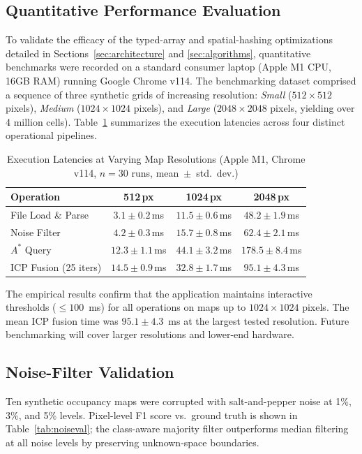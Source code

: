 \documentclass[journal]{IEEEtran}
\begin{document}
\subsection{Quantitative Performance Evaluation}
To validate the efficacy of the typed-array and spatial-hashing optimizations detailed in Sections~\ref{sec:architecture} and \ref{sec:algorithms}, quantitative benchmarks were recorded on a standard consumer laptop (Apple M1 CPU, 16GB RAM) running Google Chrome v114. The benchmarking dataset comprised a sequence of three synthetic grids of increasing resolution: \emph{Small} ($512 \times 512$ pixels), \emph{Medium} ($1024 \times 1024$ pixels), and \emph{Large} ($2048 \times 2048$ pixels, yielding over 4 million cells). Table~\ref{tab:benchmarks} summarizes the execution latencies across four distinct operational pipelines.

\begin{table}[t]
\centering
\caption{Execution Latencies at Varying Map Resolutions (Apple M1, Chrome v114, $n=30$ runs, mean~$\pm$~std.\ dev.)}
\label{tab:benchmarks}
\scriptsize
\renewcommand{\arraystretch}{1.1}
\begin{tabular}{@{}lccc@{}}
\toprule
\textbf{Operation} & \textbf{512\,px} & \textbf{1024\,px} & \textbf{2048\,px} \\
\midrule
File Load \& Parse & $3.1 \pm 0.2$\,ms & $11.5 \pm 0.6$\,ms & $48.2 \pm 1.9$\,ms \\
Noise Filter & $4.2 \pm 0.3$\,ms & $15.7 \pm 0.8$\,ms & $62.4 \pm 2.1$\,ms \\
$A^{*}$ Query & $12.3 \pm 1.1$\,ms & $44.1 \pm 3.2$\,ms & $178.5 \pm 8.4$\,ms \\
ICP Fusion (25 iters) & $14.5 \pm 0.9$\,ms & $32.8 \pm 1.7$\,ms & $95.1 \pm 4.3$\,ms \\
\bottomrule
\end{tabular}
\vspace{-2mm}
\end{table}

The empirical results confirm that the application maintains interactive thresholds ($\le100$~ms) for all operations on maps up to $1024\times1024$ pixels. The mean ICP fusion time was $95.1\pm4.3$~ms at the largest tested resolution. Future benchmarking will cover larger resolutions and lower-end hardware.

\subsection{Noise-Filter Validation}
Ten synthetic occupancy maps were corrupted with salt-and-pepper noise at 1\%, 3\%, and 5\% levels. Pixel-level F1 score vs.\ ground truth is shown in Table~\ref{tab:noiseval}; the class-aware majority filter outperforms median filtering at all noise levels by preserving unknown-space boundaries.
\end{document}
